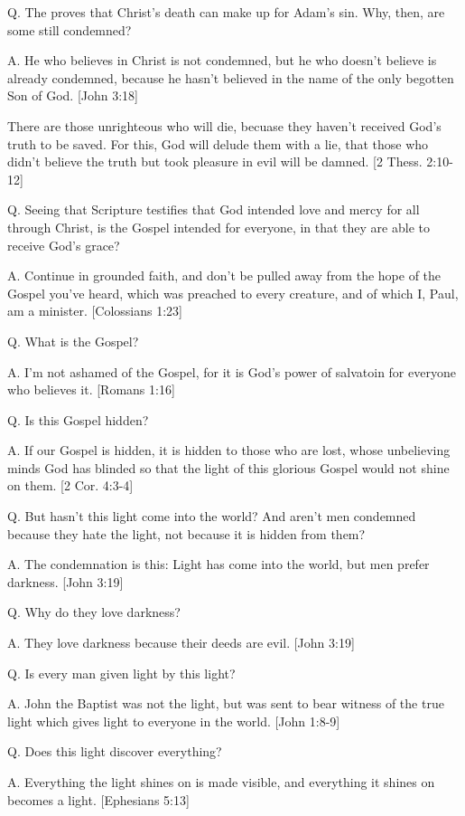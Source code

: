 \documentclass[../main.tex]{subfiles}
\begin{document}
	Q. The proves that Christ's death can make up for Adam's sin. Why, then, are some still condemned?

	A. He who believes in Christ is not condemned, but he who doesn't believe is already condemned, because he hasn't believed in the name of the only begotten Son of God. [John 3:18]

	There are those unrighteous who will die, becuase they haven't received God's truth to be saved. For this, God will delude them with a lie, that those who didn't believe the truth but took pleasure in evil will be damned. [2 Thess. 2:10-12]

	Q. Seeing that Scripture testifies that God intended love and mercy for all through Christ, is the Gospel intended for everyone, in that they are able to receive God's grace?

	A. Continue in grounded faith, and don't be pulled away from the hope of the Gospel you've heard, which was preached to every creature, and of which I, Paul, am a minister. [Colossians 1:23]

	Q. What is the Gospel?

	A. I'm not ashamed of the Gospel, for it is God's power of salvatoin for everyone who believes it. [Romans 1:16]

	Q. Is this Gospel hidden?

	A. If our Gospel is hidden, it is hidden to those who are lost, whose unbelieving minds God has blinded so that the light of this glorious Gospel would not shine on them. [2 Cor. 4:3-4]

	Q. But hasn't this light come into the world? And aren't men condemned because they hate the light, not because it is hidden from them?

	A. The condemnation is this: Light has come into the world, but men prefer darkness. [John 3:19]

	Q. Why do they love darkness?

	A. They love darkness because their deeds are evil. [John 3:19]

	Q. Is every man given light by this light?

	A. John the Baptist was not the light, but was sent to bear witness of the true light which gives light to everyone in the world. [John 1:8-9]

	Q. Does this light discover everything?

	A. Everything the light shines on is made visible, and everything it shines on becomes a light. [Ephesians 5:13]
\end{document}
